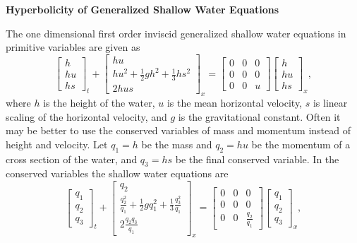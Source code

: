 \documentclass[oneside]{article}
\begin{document}
  \begin{center}
    \textbf{\Large{Hyperbolicity of Generalized Shallow Water Equations}} \\
  \end{center}

  The one dimensional first order inviscid generalized shallow water equations in
  primitive variables are given as
  \begin{equation}
    \begin{bmatrix}
      h \\
      hu \\
      hs
    \end{bmatrix}_t +
    \begin{bmatrix}
      hu \\
      hu^2 + \frac{1}{2}gh^2 + \frac{1}{3}hs^2 \\
      2hus
    \end{bmatrix}_x
    =
    \begin{bmatrix}
      0 & 0 & 0 \\
      0 & 0 & 0 \\
      0 & 0 & u
    \end{bmatrix}
    \begin{bmatrix}
      h \\
      hu \\
      hs
    \end{bmatrix}_x,
  \end{equation}
  where \(h\) is the height of the water, \(u\) is the mean horizontal velocity, \(s\)
  is linear scaling of the horizontal velocity, and \(g\) is the gravitational constant.
  Often it may be better to use the conserved variables of mass and momentum instead of
  height and velocity.
  Let \(q_1 = h\) be the mass and \(q_2 = hu\) be the momentum of a cross section of the
  water, and \(q_3 = hs\) be the final conserved variable.
  In the conserved variables the shallow water equations are
  \begin{equation}
    \begin{bmatrix}
      q_1 \\
      q_2 \\
      q_3
    \end{bmatrix}_t +
    \begin{bmatrix}
      q_2 \\
      \frac{q_2^2}{q_1} + \frac{1}{2}g q_1^2 + \frac{1}{3} \frac{q_3^2}{q_1} \\
      2 \frac{q_2 q_3}{q_1}
    \end{bmatrix}_x
    =
    \begin{bmatrix}
      0 & 0 & 0 \\
      0 & 0 & 0 \\
      0 & 0 & \frac{q_2}{q_1}
    \end{bmatrix}
    \begin{bmatrix}
      q_1 \\
      q_2 \\
      q_3
    \end{bmatrix}_x,
  \end{equation}
\end{document}
